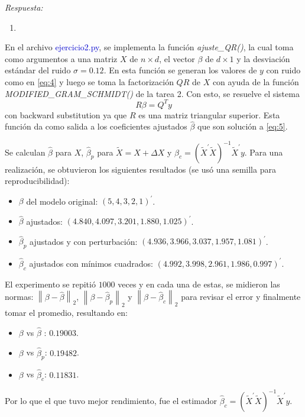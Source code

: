 \textcolor{BrickRed}{\it Respuesta:}

{\color{blue}
	\begin{enumerate}[label=(\alph*), start=1]
		\item  
\end{enumerate}}
En el archivo \textcolor{mediumblue}{ejercicio2.py}, se implementa la función \textit{ajuste\_QR()}, la cual toma como argumentos a una matriz $X$ de $n\times d$, el vector $\beta$ de $d\times 1$ y la desviación estándar del ruido $\sigma=0.12$. En esta función se generan los valores de $y$ con ruido como en \eqref{eq:4} y luego se toma la factorización $QR$ de $X$ con ayuda de la función \textit{MODIFIED\_GRAM\_SCHMIDT()} de la tarea 2. Con esto, se resuelve el sistema
\begin{equation} \label{eq:5}
	R\beta = Q^{T}y
\end{equation}
con backward substitution ya que $R$ es una matriz triangular superior. Esta función da como salida a los coeficientes ajustados $\hat{\beta}$ que son solución a \eqref{eq:5}.

Se calculan $\hat{\beta}$ para $X$, $\hat{\beta}_p$ para $\tilde{X} = X+\Delta X$ y $\hat{\beta}_c = \left(\tilde{X}^{\prime}\tilde{X}\right)^{-1}\tilde{X}^{\prime} y$. Para una realización, se obtuvieron los siguientes resultados (se usó una semilla para reproducibilidad):
\begin{itemize}
	\item $\beta$ del modelo original: $\left(5, 4, 3, 2, 1\right)^{\prime}$.
	\item $\hat{\beta}$ ajustados: $\left( 4.840, 4.097, 3.201, 1.880,  1.025 \right)^{\prime}$.
	\item $\hat{\beta}_{p}$ ajustados y con perturbación: $\left( 4.936, 3.966, 3.037,  1.957, 1.081 \right)^{\prime}$.
	\item $\hat{\beta}_{c}$ ajustados con mínimos cuadrados: $\left(4.992, 3.998, 2.961, 1.986, 0.997 \right)^{\prime}$.
\end{itemize}

El experimento se repitió $1000$ veces y en cada una de estas, se midieron las normas: $\left\| \beta - \hat{\beta} \right\|_2$, $\left\| \beta - \hat{\beta}_p \right\|_2$ y $\left\| \beta - \hat{\beta}_c \right\|_2$ para revisar el error y finalmente tomar el promedio, resultando en:
\begin{itemize}
	\item $\beta$ vs $\hat{\beta}$ : $0.19003$.
	\item $\beta$ vs $\hat{\beta}_p$: $0.19482$.
	\item $\beta$ vs $\hat{\beta}_c$: $0.11831$.
\end{itemize}
Por lo que el que tuvo mejor rendimiento, fue el estimador $\hat{\beta}_c = \left(\tilde{X}^{\prime}\tilde{X}\right)^{-1}\tilde{X}^{\prime} y$.


